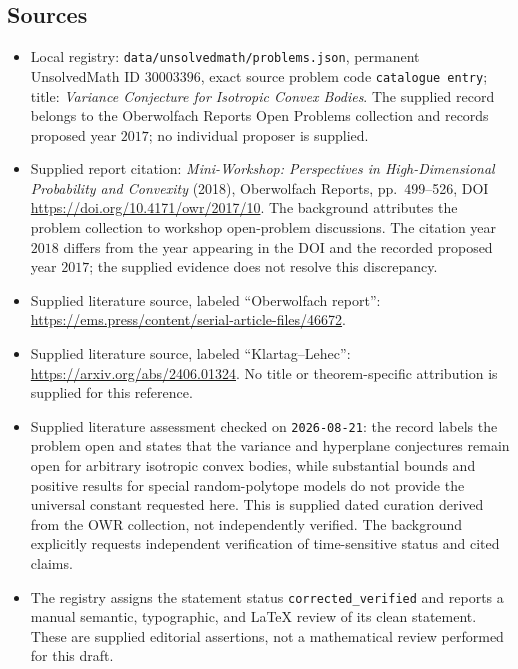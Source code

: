 \documentclass[11pt]{article}
\begin{document}
\subsection{Sources}
\begin{itemize}
\item Local registry: \texttt{data/unsolvedmath/problems.json}, permanent UnsolvedMath ID \(30003396\), exact source problem code \texttt{catalogue entry}; title: \emph{Variance Conjecture for Isotropic Convex Bodies}. The supplied record belongs to the Oberwolfach Reports Open Problems collection and records proposed year \(2017\); no individual proposer is supplied.
\item Supplied report citation: \emph{Mini-Workshop: Perspectives in High-Dimensional Probability and Convexity} (2018), Oberwolfach Reports, pp.~499--526, DOI \url{https://doi.org/10.4171/owr/2017/10}. The background attributes the problem collection to workshop open-problem discussions. The citation year \(2018\) differs from the year appearing in the DOI and the recorded proposed year \(2017\); the supplied evidence does not resolve this discrepancy.
\item Supplied literature source, labeled ``Oberwolfach report'': \url{https://ems.press/content/serial-article-files/46672}.
\item Supplied literature source, labeled ``Klartag--Lehec'': \url{https://arxiv.org/abs/2406.01324}. No title or theorem-specific attribution is supplied for this reference.
\item Supplied literature assessment checked on \texttt{2026-08-21}: the record labels the problem open and states that the variance and hyperplane conjectures remain open for arbitrary isotropic convex bodies, while substantial bounds and positive results for special random-polytope models do not provide the universal constant requested here. This is supplied dated curation derived from the OWR collection, not independently verified. The background explicitly requests independent verification of time-sensitive status and cited claims.
\item The registry assigns the statement status \texttt{corrected\_verified} and reports a manual semantic, typographic, and LaTeX review of its clean statement. These are supplied editorial assertions, not a mathematical review performed for this draft.
\end{itemize}
\end{document}
